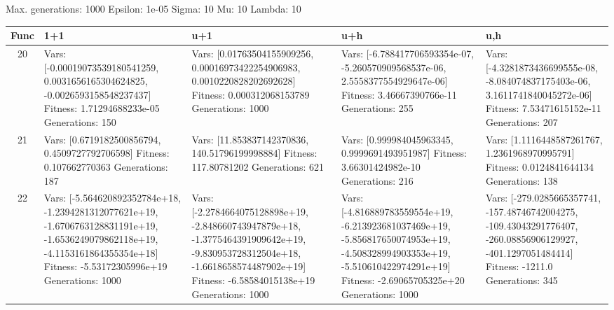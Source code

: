 \documentclass[landscape,11pt]{article}
\begin{document}
\newpage
Max. generations: 1000 Epsilon: 1e-05 Sigma: 10 Mu: 10 Lambda: 10 \\
\begin{tabular}{|c|p{5.4cm}|p{5.4cm}|p{5.4cm}|p{5.4cm}|}
\hline
Func & 1+1 & u+1 & u+h & u,h \\ 
\hline 20 & Vars: [-0.00019073539180541259, 0.0031656165304624825, -0.0026593158548237437] Fitness: 1.71294688233e-05 Generations: 150 & Vars: [0.01763504155909256, 0.00016973422254906983, 0.0010220828202692628] Fitness: 0.000312068153789 Generations: 1000 & Vars: [-6.788417706593354e-07, -5.260570909568537e-06, 2.5558377554929647e-06] Fitness: 3.46667390766e-11 Generations: 255 & Vars: [-4.3281873436699555e-08, -8.084074837175403e-06, 3.1611741840045272e-06] Fitness: 7.53471615152e-11 Generations: 207 \\
 \hline 
 21 & Vars: [0.6719182500856794, 0.4509727792706598] Fitness: 0.107662770363 Generations: 187 & Vars: [11.853837142370836, 140.51796199998884] Fitness: 117.80781202 Generations: 621 & Vars: [0.999984045963345, 0.9999691493951987] Fitness: 3.66301424982e-10 Generations: 216 & Vars: [1.1116448587261767, 1.2361968970995791] Fitness: 0.0124841644134 Generations: 138 \\
 \hline 
 22 & Vars: [-5.564620892352784e+18, -1.2394281312077621e+19, -1.6706763128831191e+19, -1.6536249079862118e+19, -4.1153161864355354e+18] Fitness: -5.53172305996e+19 Generations: 1000 & Vars: [-2.2784664075128898e+19, -2.848660743947879e+18, -1.3775464391909642e+19, -9.830953728312504e+18, -1.6618658574487902e+19] Fitness: -6.58584015138e+19 Generations: 1000 & Vars: [-4.816889783559554e+19, -6.213923681037469e+19, -5.856817650074953e+19, -4.508328994903353e+19, -5.510610422974291e+19] Fitness: -2.69065705325e+20 Generations: 1000 & Vars: [-279.0285665357741, -157.48746742004275, -109.43043291776407, -260.08856906129927, -401.1297051484414] Fitness: -1211.0 Generations: 345 \\
 \hline 
\end{tabular}
\newpage
\end{document}
